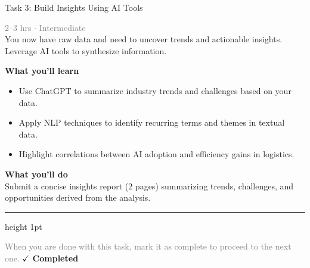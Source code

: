 \documentclass[10pt,a4paper]{article}
\begin{document}
\begin{taskbox}{Task 3: Build Insights Using AI Tools}

    {\small \textcolor{gray}{2--3 hrs $\cdot$ Intermediate}}\\[12pt]

      
You now have raw data and need to uncover trends and actionable insights. Leverage AI tools to synthesize information.  


\vspace{8pt}
{\large \textbf{\textcolor{brandLight}{What you'll learn}}}\\[4pt]  
\begin{itemize}
    \item Use ChatGPT to summarize industry trends and challenges based on your data.  
    \item Apply NLP techniques to identify recurring terms and themes in textual data.  
    \item Highlight correlations between AI adoption and efficiency gains in logistics.  
\end{itemize}

\vspace{8pt}
{\large \textbf{\textcolor{brandLight}{What you'll do}}}\\[4pt]  
Submit a concise insights report (2 pages) summarizing trends, challenges, and opportunities derived from the analysis.\par

    \vspace{16pt}

    \textcolor{cardBorder}{\hrule height 1pt}\vspace{8pt}

    \small \textcolor{gray}{When you are done with this task, mark it as complete to proceed to the next one.} \hfill \textbf{\textcolor{brandDark}{$\checkmark$ Completed}}

\end{taskbox}
\end{document}
